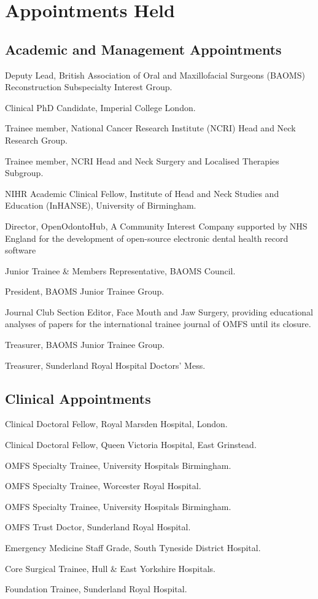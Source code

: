 \section*{Appointments Held}

\subsection*{Academic and Management Appointments}

 Deputy Lead, British Association of Oral and Maxillofacial Surgeons (BAOMS) Reconstruction Subspecialty Interest Group.

 Clinical PhD Candidate, Imperial College London.

 Trainee member, National Cancer Research Institute (NCRI) Head and Neck Research Group.

 Trainee member, NCRI Head and Neck Surgery and Localised Therapies Subgroup.

 NIHR Academic Clinical Fellow, Institute of Head and Neck Studies and Education (InHANSE), University of Birmingham.

 Director, OpenOdontoHub, A Community Interest Company supported by NHS England for the development of open-source electronic dental health record software

 Junior Trainee \& Members Representative, BAOMS Council.

 President, BAOMS Junior Trainee Group.

 Journal Club Section Editor, Face Mouth and Jaw Surgery, providing educational analyses of papers for the international trainee journal of OMFS until its closure.

 Treasurer, BAOMS Junior Trainee Group.

 Treasurer, Sunderland Royal Hospital Doctors' Mess.



\subsection*{Clinical Appointments}

 Clinical Doctoral Fellow, Royal Marsden Hospital, London.

 Clinical Doctoral Fellow, Queen Victoria Hospital, East Grinstead.

 OMFS Specialty Trainee, University Hospitals Birmingham.

 OMFS Specialty Trainee, Worcester Royal Hospital.

 OMFS Specialty Trainee, University Hospitals Birmingham.

 OMFS Trust Doctor, Sunderland Royal Hospital.

 Emergency Medicine Staff Grade, South Tyneside District Hospital.

 Core Surgical Trainee, Hull \& East Yorkshire Hospitals.

 Foundation Trainee, Sunderland Royal Hospital.
